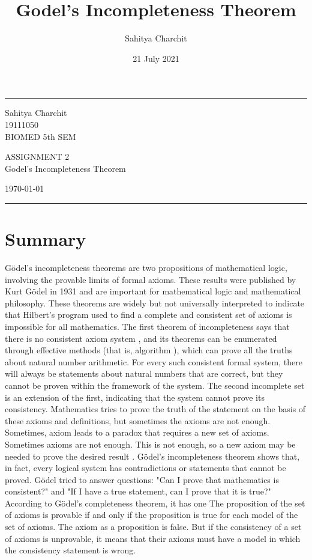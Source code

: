 \documentclass{article}
\title{Godel's Incompleteness Theorem}
\author{Sahitya Charchit }
\date{21 July 2021}
\begin{document}
    
    \fancyhead{}
    \hrule \medskip %
    \begin{minipage}{0.295\textwidth} 
    \raggedright
    \footnotesize
    Sahitya Charchit\hfill\\   
    19111050\hfill\\
    BIOMED 5th SEM
    \end{minipage}
    \begin{minipage}{0.4\textwidth} 
    \centering 
    \large 
    ASSIGNMENT 2\\
    \normalsize 
    Godel's Incompleteness Theorem\\ 
    \end{minipage}
    \begin{minipage}{0.295\textwidth} 
    \raggedleft
    \today\hfill\\
    \end{minipage}
    \medskip\hrule 
    \bigskip
\section{Summary}
Gödel's incompleteness theorems are two propositions of mathematical logic, involving the provable limits of formal axioms. These results were published by Kurt Gödel in 1931 and are important for mathematical logic and mathematical philosophy.  These theorems are widely but not universally interpreted to indicate that  Hilbert's  program used to find a complete and consistent set of axioms is impossible for all mathematics. The first theorem of incompleteness says that there is no consistent axiom system , and its theorems can be enumerated through effective methods (that is, algorithm ), which can prove all the truths about natural number arithmetic.  For every such consistent formal system, there will always be statements about  natural numbers that are correct, but they cannot be proven within the framework of the system. The second  incomplete set is an extension of the first, indicating that the system  cannot prove its consistency.  Mathematics tries to prove the truth of the statement on the basis of these axioms and definitions, but sometimes the axioms are not enough. Sometimes, axiom  leads to a paradox that requires a new set of axioms. Sometimes  axioms are not enough. This is not enough, so a new axiom may be needed to prove the desired result .  Gödel’s incompleteness theorem shows that, in fact, every logical system  has contradictions or statements that cannot be proved. Gödel tried to answer  questions: "Can I prove that mathematics is consistent?" and  "If I have a true statement, can I prove that it is true?"  According to Gödel's completeness theorem, it has one The proposition of the set of axioms  is provable if and only if the proposition is true for each model of the set of axioms.  The axiom as a proposition is false. But if the consistency of a set of axioms  is unprovable, it means that their  axioms must have a model in which the consistency statement is wrong.
\end{document}
